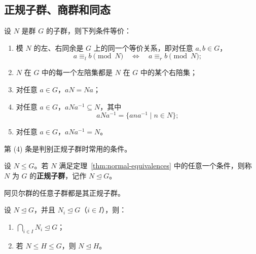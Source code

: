 \subsection{正规子群、商群和同态}

\begin{theorem}\label{thm:normal-equivalences}
设 $N$ 是群 $G$ 的子群，则下列条件等价：
\begin{enumerate}[label=(\arabic*)]
  \item 模 $N$ 的左、右同余是 $G$ 上的同一个等价关系，即对任意 $a,b\in G$，
  \[
    a\equiv_l b\pmod N\quad\Longleftrightarrow\quad a\equiv_r b\pmod N;
  \]
  \item $N$ 在 $G$ 中的每一个左陪集都是 $N$ 在 $G$ 中的某个右陪集；
  \item 对任意 $a\in G$，$aN=Na$；
  \item 对任意 $a\in G$，$aNa^{-1}\subseteq N$，其中
  \[
    aNa^{-1}=\{ana^{-1}\mid n\in N\};
  \]
  \item 对任意 $a\in G$，$aNa^{-1}=N$。
\end{enumerate}
\end{theorem}

\begin{purplenote}
第 (4) 条是判别正规子群时常用的条件。
\end{purplenote}

\begin{definition}[正规子群]\label{def:normal-subgroup}
设 $N\leq G$。若 $N$ 满足定理~\ref{thm:normal-equivalences} 中的任意一个条件，则称 $N$ 为 $G$ 的\textbf{正规子群}，记作 $N\trianglelefteq G$。
\end{definition}

\begin{purplenote}
阿贝尔群的任意子群都是其正规子群。
\end{purplenote}

\begin{proposition}\label{prop:normal-intersection-restriction}
设 $N\trianglelefteq G$，并且 $N_i\trianglelefteq G$（$i\in I$），则：
\begin{enumerate}[label=(\arabic*)]
  \item $\displaystyle\bigcap_{i\in I}N_i\trianglelefteq G$；
  \item 若 $N\leq H\leq G$，则 $N\trianglelefteq H$。
\end{enumerate}
\end{proposition}

